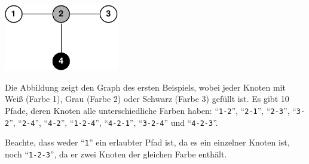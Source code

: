 \section*{}

\includegraphics[width=5cm]{pathsfig.pdf}

Die Abbildung zeigt den Graph des ersten Beispiels, wobei jeder Knoten mit Weiß (Farbe 1), Grau (Farbe 2) oder Schwarz (Farbe 3) gefüllt ist. Es gibt 10 Pfade, deren Knoten alle unterschiedliche Farben haben: ``\texttt{1-2}'', ``\texttt{2-1}'', ``\texttt{2-3}'', ``\texttt{3-2}'', ``\texttt{2-4}'', ``\texttt{4-2}'', ``\texttt{1-2-4}'', ``\texttt{4-2-1}'', ``\texttt{3-2-4}'' und ``\texttt{4-2-3}''.

Beachte, dass weder ``\texttt{1}'' ein erlaubter Pfad ist, da es ein einzelner Knoten ist, noch ``\texttt{1-2-3}'', da er zwei Knoten der gleichen Farbe enthält.